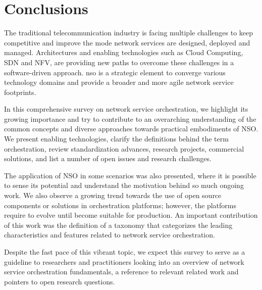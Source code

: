 \section{Conclusions}
\label{sec:Conclusion}

The traditional telecommunication industry is facing multiple challenges to keep competitive and improve the mode network services are designed, deployed and managed. Architectures and enabling technologies such as Cloud Computing, SDN and NFV, are providing new paths to overcome these challenges in a software-driven approach.  \acrfull{nso} is a strategic element to converge various technology domains and provide a broader and more agile network service footprints. 

In this comprehensive survey on network service orchestration, we highlight its growing importance and try to contribute to an overarching understanding of the common concepts and diverse approaches towards practical embodiments of NSO. We present enabling technologies, clarify the definitions behind the term orchestration, review standardization advances, research projects, commercial solutions, and list a number of open issues and research challenges. 

The application of NSO in some scenarios was also presented, where it is possible to sense its potential and understand the motivation behind so much ongoing work. We also observe a growing trend towards the use of open source components or solutions in orchestration platforms; however, the platforms require to evolve until become suitable for production. An important contribution of this work was the definition of a taxonomy that categorizes the leading characteristics and features related to network service orchestration.

Despite the fast pace of this vibrant topic, we expect this survey to serve as a guideline to researchers and practitioners looking into an overview of network service orchestration fundamentals, a reference to relevant related work and pointers to open research questions.